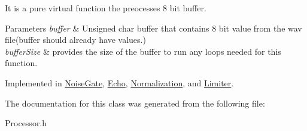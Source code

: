 It is a pure virtual function the preocesses 8 bit buffer. 


\begin{DoxyParams}{Parameters}
{\em buffer} & Unsigned char buffer that contains 8 bit value from the wav file(buffer should already have values.) \\
\hline
{\em buffer\+Size} & provides the size of the buffer to run any loops needed for this function. \\
\hline
\end{DoxyParams}


Implemented in \hyperlink{classNoiseGate_afbf50fc4dce474a9f588696756b7e1ad}{Noise\+Gate}, \hyperlink{classEcho_af4337545ebf5602337e605376bfa8dc3}{Echo}, \hyperlink{classNormalization_ab1303e7cd41e3ec49edafd7b83cb5480}{Normalization}, and \hyperlink{classLimiter_acc021d4c3af04a48b8af7bb8853ce654}{Limiter}.



The documentation for this class was generated from the following file\+:\begin{DoxyCompactItemize}
\item 
Processor.\+h\end{DoxyCompactItemize}
